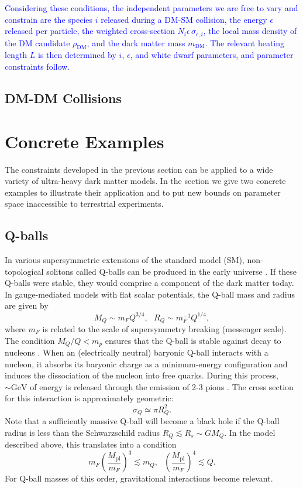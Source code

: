 \documentclass[twocolumn,showpacs,preprintnumbers,amsmath,amssymb,prd]{revtex4}
\newcommand{\Mpl}{M_{\text{pl}}}
\def\r{\right)}
\def\l{\left(}
\begin{document}
\textcolor{blue}{Considering these conditions, the independent parameters we are free to vary and constrain are the species $i$ released during a DM-SM collision, the energy $\epsilon$ released per particle, the weighted cross-section $N_i \epsilon\, \sigma_{\epsilon,i}$, the local mass density of the DM candidate $\rho_\text{DM}$, and the dark matter mass $m_\text{DM}$. The relevant heating length $L$ is then determined by $i$, $\epsilon$, and white dwarf parameters, and parameter constraints follow.}


\subsection{DM-DM Collisions}
\label{sec:CollisionConstraints}


\section{Concrete Examples}
\label{sec:ConcreteExamples}

The constraints developed in the previous section can be applied to a wide variety of ultra-heavy dark matter models. In the section we give two concrete examples to illustrate their application and to put new bounds on parameter space inaccessible to terrestrial experiments.

\subsection{Q-balls}
\label{sec:Qballs}
In various supersymmetric extensions of the standard model (SM), non-topological solitons called Q-balls can be produced in the early universe \cite{Coleman:1985ki, Kusenko:1997si}. If these Q-balls were stable, they would comprise a component of the dark matter today. In gauge-mediated models with flat scalar potentials, the Q-ball mass and radius are given by
\begin{equation}
\label{eq:Qballprop}
M_Q \sim m_F Q^{3/4}, ~~~ R_Q \sim m_F^{-1} Q^{1/4},
\end{equation}
where $m_F$ is related to the scale of supersymmetry breaking (messenger scale). The condition $M_Q/Q < m_p$ ensures that the Q-ball is stable against decay to nucleons \cite{Dine:2003ax}. When an (electrically neutral) baryonic Q-ball interacts with a nucleon, it absorbs its baryonic charge as a minimum-energy configuration and induces the dissociation of the nucleon into free quarks. During this process, $\sim \text{GeV}$ of energy is released through the emission of 2-3 pions \cite{Dine:2003ax}. The cross section for this interaction is approximately geometric:
\begin{equation}
\sigma_Q \simeq \pi R_Q^2.
\end{equation}
Note that a sufficiently massive Q-ball will become a black hole if the Q-ball radius is less than the Schwarzschild radius $R_Q \lesssim R_s \sim G M_Q$. In the model described above, this translates into a condition
\begin{equation}
m_F \l\frac{\Mpl}{m_F}\r^3 \lesssim m_Q, ~~~ \l\frac{\Mpl}{m_F}\r^4 \lesssim Q.
\end{equation}
For Q-ball masses of this order, gravitational interactions become relevant.
\end{document}
